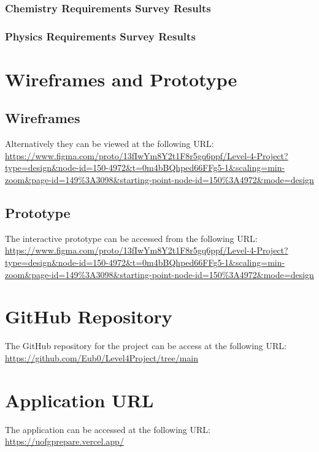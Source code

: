 \documentclass{l4proj}
\begin{document}
\begin{appendices}
\subsection{Chemistry Requirements Survey Results} \label{app:chemReqResults}


\subsection{Physics Requirements Survey Results} \label{app:physReqResults}


\chapter{Wireframes and Prototype}
\section{Wireframes} \label{app:wireframes}

Alternatively they can be viewed at the following URL:
\newline
\url{https://www.figma.com/proto/13fIwYm8Y2t1F8r5gq6ppf/Level-4-Project?type=design&node-id=150-4972&t=0m4bBQhped66FFg5-1&scaling=min-zoom&page-id=149%3A3098&starting-point-node-id=150%3A4972&mode=design}

\section{Prototype} \label{app:prototype}
The interactive prototype can be accessed from the following URL:
\newline
\url{https://www.figma.com/proto/13fIwYm8Y2t1F8r5gq6ppf/Level-4-Project?type=design&node-id=150-4972&t=0m4bBQhped66FFg5-1&scaling=min-zoom&page-id=149%3A3098&starting-point-node-id=150%3A4972&mode=design}

\chapter{GitHub Repository}
The GitHub repository for the project can be access at the following URL:
\newline
\url{https://github.com/Eub0/Level4Project/tree/main}

\chapter{Application URL} \label{app:application}
The application can be accessed at the following URL:
\newline
\url{https://uofgprepare.vercel.app/}


\end{appendices}
\end{document}
